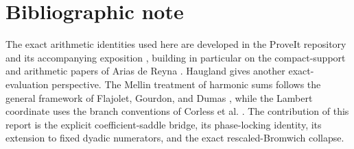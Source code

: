\documentclass[11pt,oneside]{article}
\theoremstyle{definition}
\theoremstyle{remark}
\begin{document}
\section{Bibliographic note}

The exact arithmetic identities used here are developed in the ProveIt repository and its accompanying exposition \cite{dyadicasymbridge:proveit,dyadicasymbridge:masterdoc}, building in particular on the compact-support and arithmetic papers of Arias de Reyna \cite{dyadicasymbridge:arias1982,dyadicasymbridge:arias2018}.  Haugland \cite{dyadicasymbridge:haugland2016} gives another exact-evaluation perspective.  The Mellin treatment of harmonic sums follows the general framework of Flajolet, Gourdon, and Dumas \cite{dyadicasymbridge:flajolet1995}, while the Lambert coordinate uses the branch conventions of Corless et al. \cite{dyadicasymbridge:corless1996}.  The contribution of this report is the explicit coefficient-saddle bridge, its phase-locking identity, its extension to fixed dyadic numerators, and the exact rescaled-Bromwich collapse.
\end{document}
